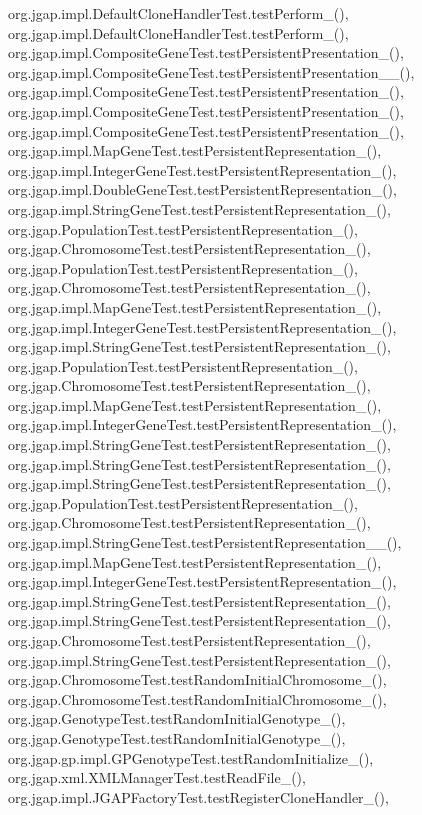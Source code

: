 org.\-jgap.\-impl.\-Default\-Clone\-Handler\-Test.\-test\-Perform\-\_(), org.\-jgap.\-impl.\-Default\-Clone\-Handler\-Test.\-test\-Perform\-\_(), org.\-jgap.\-impl.\-Composite\-Gene\-Test.\-test\-Persistent\-Presentation\-\_(), org.\-jgap.\-impl.\-Composite\-Gene\-Test.\-test\-Persistent\-Presentation\-\_\-\_(), org.\-jgap.\-impl.\-Composite\-Gene\-Test.\-test\-Persistent\-Presentation\-\_(), org.\-jgap.\-impl.\-Composite\-Gene\-Test.\-test\-Persistent\-Presentation\-\_(), org.\-jgap.\-impl.\-Composite\-Gene\-Test.\-test\-Persistent\-Presentation\-\_(), org.\-jgap.\-impl.\-Map\-Gene\-Test.\-test\-Persistent\-Representation\-\_(), org.\-jgap.\-impl.\-Integer\-Gene\-Test.\-test\-Persistent\-Representation\-\_(), org.\-jgap.\-impl.\-Double\-Gene\-Test.\-test\-Persistent\-Representation\-\_(), org.\-jgap.\-impl.\-String\-Gene\-Test.\-test\-Persistent\-Representation\-\_(), org.\-jgap.\-Population\-Test.\-test\-Persistent\-Representation\-\_(), org.\-jgap.\-Chromosome\-Test.\-test\-Persistent\-Representation\-\_(), org.\-jgap.\-Population\-Test.\-test\-Persistent\-Representation\-\_(), org.\-jgap.\-Chromosome\-Test.\-test\-Persistent\-Representation\-\_(), org.\-jgap.\-impl.\-Map\-Gene\-Test.\-test\-Persistent\-Representation\-\_(), org.\-jgap.\-impl.\-Integer\-Gene\-Test.\-test\-Persistent\-Representation\-\_(), org.\-jgap.\-impl.\-String\-Gene\-Test.\-test\-Persistent\-Representation\-\_(), org.\-jgap.\-Population\-Test.\-test\-Persistent\-Representation\-\_(), org.\-jgap.\-Chromosome\-Test.\-test\-Persistent\-Representation\-\_(), org.\-jgap.\-impl.\-Map\-Gene\-Test.\-test\-Persistent\-Representation\-\_(), org.\-jgap.\-impl.\-Integer\-Gene\-Test.\-test\-Persistent\-Representation\-\_(), org.\-jgap.\-impl.\-String\-Gene\-Test.\-test\-Persistent\-Representation\-\_(), org.\-jgap.\-impl.\-String\-Gene\-Test.\-test\-Persistent\-Representation\-\_(), org.\-jgap.\-impl.\-String\-Gene\-Test.\-test\-Persistent\-Representation\-\_(), org.\-jgap.\-Population\-Test.\-test\-Persistent\-Representation\-\_(), org.\-jgap.\-Chromosome\-Test.\-test\-Persistent\-Representation\-\_(), org.\-jgap.\-impl.\-String\-Gene\-Test.\-test\-Persistent\-Representation\-\_\-\_(), org.\-jgap.\-impl.\-Map\-Gene\-Test.\-test\-Persistent\-Representation\-\_(), org.\-jgap.\-impl.\-Integer\-Gene\-Test.\-test\-Persistent\-Representation\-\_(), org.\-jgap.\-impl.\-String\-Gene\-Test.\-test\-Persistent\-Representation\-\_(), org.\-jgap.\-impl.\-String\-Gene\-Test.\-test\-Persistent\-Representation\-\_(), org.\-jgap.\-Chromosome\-Test.\-test\-Persistent\-Representation\-\_(), org.\-jgap.\-impl.\-String\-Gene\-Test.\-test\-Persistent\-Representation\-\_(), org.\-jgap.\-Chromosome\-Test.\-test\-Random\-Initial\-Chromosome\-\_(), org.\-jgap.\-Chromosome\-Test.\-test\-Random\-Initial\-Chromosome\-\_(), org.\-jgap.\-Genotype\-Test.\-test\-Random\-Initial\-Genotype\-\_(), org.\-jgap.\-Genotype\-Test.\-test\-Random\-Initial\-Genotype\-\_(), org.\-jgap.\-gp.\-impl.\-G\-P\-Genotype\-Test.\-test\-Random\-Initialize\-\_(), org.\-jgap.\-xml.\-X\-M\-L\-Manager\-Test.\-test\-Read\-File\-\_(), org.\-jgap.\-impl.\-J\-G\-A\-P\-Factory\-Test.\-test\-Register\-Clone\-Handler\-\_(), 